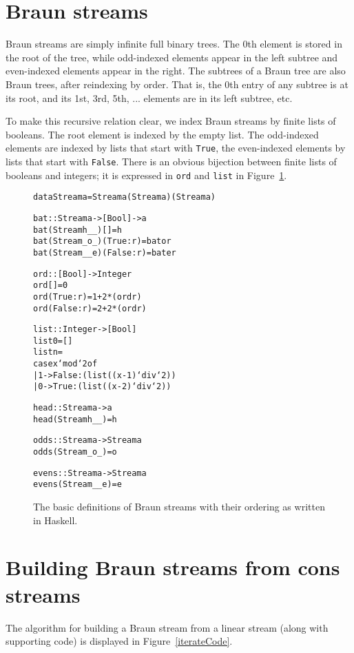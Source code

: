 \documentclass{llncs}
\begin{document}
\section{Braun streams}

Braun streams are simply infinite full binary trees.
The $0$th element is stored in the root of the tree, while odd-indexed elements appear in the left subtree and even-indexed elements appear in the right.
The subtrees of a Braun tree are also Braun trees, after reindexing by order.
That is, the 0th entry of any subtree is at its root, and its 1st, 3rd, 5th, ... elements are in its left subtree, etc.

To make this recursive relation clear, we index Braun streams by finite lists of booleans.
The root element is indexed by the empty list.
The odd-indexed elements are indexed by lists that start with \verb|True|, the even-indexed elements by lists that start with \verb|False|.
There is an obvious bijection between finite lists of booleans and integers;
it is expressed in \verb|ord| and \verb|list| in Figure~\ref{basicCode}.

\begin{figure}
\begin{alltt}
data Stream a = Stream a (Stream a) (Stream a) 

bat :: Stream a -> [Bool] -> a
bat (Stream h _ _) [] = h
bat (Stream _ o _) (True:r) = bat o r
bat (Stream _ _ e) (False:r) = bat e r

ord :: [Bool] -> Integer
ord [] = 0
ord (True:r) = 1 + 2*(ord r)
ord (False:r) = 2 + 2*(ord r)

list :: Integer -> [Bool]
list 0 = []
list n = 
    case x `mod` 2 of
      | 1 -> False:(list ((x-1)`div`2))
      | 0 -> True:(list ((x-2)`div`2))

head :: Stream a -> a
head (Stream h _ _) = h

odds :: Stream a -> Stream a
odds (Stream _ o _) = o

evens :: Stream a -> Stream a
evens (Stream _ _ e) = e
\end{alltt}
\caption{The basic definitions of Braun streams with their ordering as written in Haskell.}
\label{basicCode}
\end{figure}

\section{Building Braun streams from cons streams}

The algorithm for building a Braun stream from a linear stream (along with supporting code) is displayed in Figure~\ref{iterateCode}.
\end{document}
